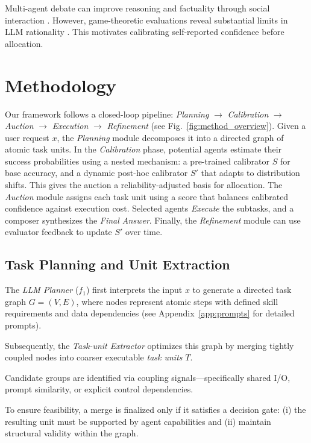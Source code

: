 \documentclass[11pt]{article}
\begin{document}
Multi-agent debate can improve reasoning and factuality through social interaction \citep{du2023improvingfactualityreasoninglanguage}. However, game-theoretic evaluations reveal substantial limits in LLM rationality \citep{fan2023largelanguagemodelsserve}. This motivates calibrating self-reported confidence before allocation.

\section{Methodology}
\label{sec:method}

Our framework follows a closed-loop pipeline: \emph{Planning} $\to$ \emph{Calibration} $\to$ \emph{Auction} $\to$ \emph{Execution} $\to$ \emph{Refinement} (see Fig.~\ref{fig:method_overview}). 
Given a user request $x$, the \emph{Planning} module decomposes it into a directed graph of atomic task units. 
In the \emph{Calibration} phase, potential agents estimate their success probabilities using a nested mechanism: a pre-trained calibrator $S$ for base accuracy, and a dynamic post-hoc calibrator $S'$ that adapts to distribution shifts. 
This gives the auction a reliability-adjusted basis for allocation.
The \emph{Auction} module assigns each task unit using a score that balances calibrated confidence against execution cost.
Selected agents \emph{Execute} the subtasks, and a composer synthesizes the \emph{Final Answer}. 
Finally, the \emph{Refinement} module can use evaluator feedback to update $S'$ over time.

\subsection{Task Planning and Unit Extraction}

The \emph{LLM Planner} ($f_{\text{1}}$) first interprets the input $x$ to generate a directed task graph $G=(V,E)$, where nodes represent atomic steps with defined skill requirements and data dependencies (see Appendix~\ref{app:prompts} for detailed prompts).

Subsequently, the \emph{Task-unit Extractor} optimizes this graph by merging tightly coupled nodes into coarser executable \emph{task units} $T$.

Candidate groups are identified via coupling signals---specifically shared I/O, prompt similarity, or explicit control dependencies.

To ensure feasibility, a merge is finalized only if it satisfies a decision gate: (i) the resulting unit must be supported by agent capabilities and (ii) maintain structural validity within the graph.
\end{document}
